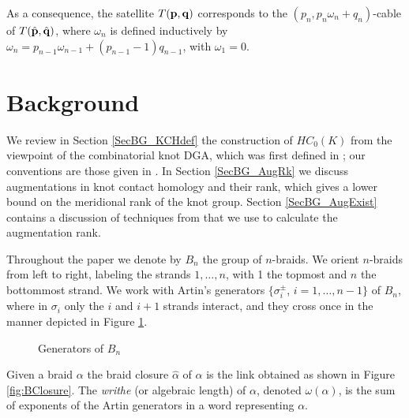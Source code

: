 \documentclass[11pt]{amsart}
\def\s{{\sigma}}
\theoremstyle{definition}
\begin{document}
As a consequence, the satellite $T({\bf p},{\bf q})$ corresponds to the $(p_n,p_n\omega_n+q_n)$-cable of $T(\hat{\bf p},\hat{\bf q})$, where $\omega_n$ is defined inductively by $\omega_n=p_{n-1}\omega_{n-1}+(p_{n-1}-1)q_{n-1}$, with $\omega_1=0$.

\section{Background}
\label{SecBG}

  We review in Section \ref{SecBG_KCHdef} the construction of $HC_0(K)$ from the viewpoint of the combinatorial knot DGA, which was first defined in \cite{Ng08}; our conventions are those given in \cite{Ng12}. In Section \ref{SecBG_AugRk} we discuss augmentations in knot contact homology and their rank, which gives a lower bound on the meridional rank of the knot group. Section \ref{SecBG_AugExist} contains a discussion of techniques from \cite{Cor13a} that we use to calculate the augmentation rank.

  Throughout the paper we denote by $B_n$ the group of $n$-braids. We orient $n$-braids from left to right, labeling the strands $1,\ldots, n$, with 1 the topmost and $n$ the bottommost strand. We work with Artin's generators $\{\sigma_i^{\pm}$, $i=1,\ldots,n-1\}$ of $B_n$, where in $\s_i$ only the $i$ and $i+1$ strands interact, and they cross once in the manner depicted in Figure \ref{fig:BraidGens}.
      \begin{figure}[ht]
        \caption{Generators of $B_n$}
        \label{fig:BraidGens}
      \end{figure}
    Given a braid $\alpha$ the braid closure $\hat{\alpha}$ of $\alpha$ is the link obtained as shown in Figure \ref{fig:BClosure}. The \emph{writhe} (or algebraic length) of $\alpha$, denoted $\omega(\alpha)$, is the sum of exponents of the Artin generators in a word representing $\alpha$.
\end{document}
